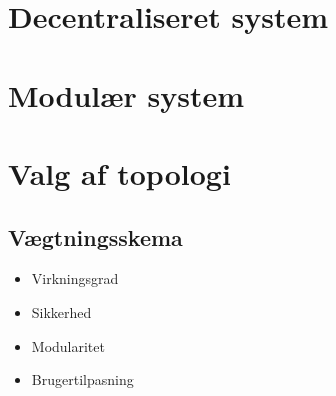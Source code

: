 \section{Decentraliseret system}

\section{Modulær system}

\section{Valg af topologi}

\subsection{Vægtningsskema}

\begin{itemize}
	\item Virkningsgrad
	\item Sikkerhed
	\item Modularitet
	\item Brugertilpasning
\end{itemize}